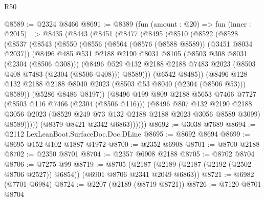 \begin{lexlean}{R50}
\begin{coremodule}
@8589 := @2324 @8466
@8691 := @8389
    (fun (amount : @20) =>
    fun (inner : @2015) =>
    @8435
      (@8443
        (@8451
          (@8477
            (@8495
              (@8510
                (@8522
                  (@8528
                    (@8537
                      (@8543
                        (@8550
                          (@8556
                            (@8564 (@8576 (@8588 @8589)) (@3451 @8034 @2037))
                            (@8496
                              @485
                              @531
                              @2188
                              @2190
                              @8031
                              @8105
                              (@8503 @308 @8031 (@2304 (@8506 @308)))
                              (@8496
                                @529
                                @132
                                @2188
                                @2188
                                @7483
                                @2023
                                (@8503 @408 @7483 (@2304 (@8506 @408)))
                                @8589)))
                          (@6542 @8485))
                        (@8496
                          @128
                          @132
                          @2188
                          @2188
                          @8040
                          @2023
                          (@8503 @53 @8040 (@2304 (@8506 @53)))
                          @8589))
                      (@5286 @8486 @8197))
                    (@8496
                      @199
                      @809
                      @2188
                      @5653
                      @7466
                      @7727
                      (@8503 @116 @7466 (@2304 (@8506 @116)))
                      (@8496
                        @807
                        @132
                        @2190
                        @2188
                        @3056
                        @2023
                        (@8529 @249 @73 @132 @2188 @2188 @2023 @3056 @8589 @3099)
                        @8589)))))
              (@8379 @8421 @2342 @6863))))))
@8692 := @3038 @7689
@8694 := @2112 LexLeanBoot.SurfaceDoc.Doc.DLine
@8695 := @8692 @8694
@8699 := @8695 @152 @102 @1887 @1972
@8700 := @2352 @6908
@8701 := @8700 @2188
@8702 := @2350 @8701
@8704 := @2357 @6908 @2188
@8705 := @8702 @8704
@8706 := @7275 @99
@8719 := @8705
    (@2187 (@2189 (@2187 (@2192 (@2502 @8706 @2527)) @6854)) (@6901 @8706 @2341 @2049 @6863))
@8721 := @6982 (@7701 @6984)
@8724 := @2207 (@2189 (@8719 @8721))
@8726 := @7120 @8701 @8704

\end{coremodule}
\end{lexlean}
